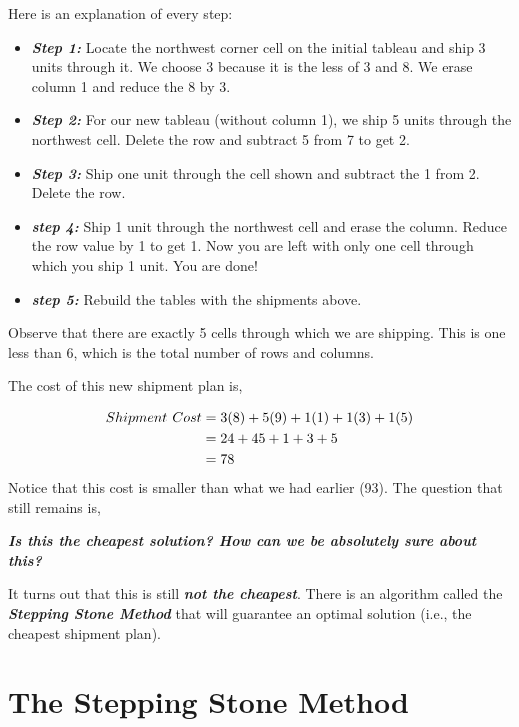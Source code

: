 \documentclass[
  letterpaper,
  DIV=11,
  numbers=noendperiod]{scrreprt}
\begin{document}
Here is an explanation of every step:

\begin{itemize}
\item
  \textbf{\emph{Step 1:}} Locate the northwest corner cell on the
  initial tableau and ship 3 units through it. We choose 3 because it is
  the less of 3 and 8. We erase column 1 and reduce the 8 by 3.
\item
  \textbf{\emph{Step 2:}} For our new tableau (without column 1), we
  ship 5 units through the northwest cell. Delete the row and subtract 5
  from 7 to get 2.
\item
  \textbf{\emph{Step 3:}} Ship one unit through the cell shown and
  subtract the 1 from 2. Delete the row.
\item
  \textbf{\emph{step 4:}} Ship 1 unit through the northwest cell and
  erase the column. Reduce the row value by 1 to get 1. Now you are left
  with only one cell through which you ship 1 unit. You are done!
\item
  \textbf{\emph{step 5:}} Rebuild the tables with the shipments above.
\end{itemize}

Observe that there are exactly 5 cells through which we are shipping.
This is one less than 6, which is the total number of rows and columns.

The cost of this new shipment plan is,

\[
\begin{aligned}
Shipment \hspace{.05in}Cost&= 3(8)+5(9)+1(1)+1(3)+1(5)\\
&=24+45+1+3+5\\
&=78
\end{aligned}
\] Notice that this cost is smaller than what we had earlier (93). The
question that still remains is,

\textbf{\emph{Is this the cheapest solution? How can we be absolutely
sure about this?}}

It turns out that this is still \textbf{\emph{not the cheapest}}. There
is an algorithm called the \textbf{\emph{Stepping Stone Method}} that
will guarantee an optimal solution (i.e., the cheapest shipment plan).

\hypertarget{the-stepping-stone-method}{%
\section{The Stepping Stone Method}\label{the-stepping-stone-method}}
\end{document}
